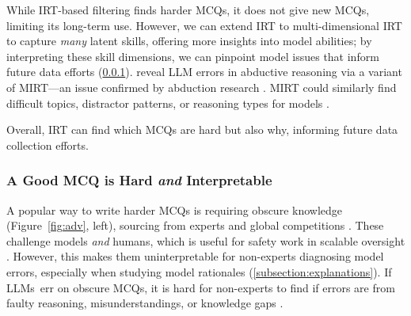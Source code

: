 
While IRT-based filtering finds harder MCQs, it does not give new MCQs, limiting its long-term use.
However, we can extend IRT to multi-dimensional IRT \cite[MIRT]{reckase200618} to capture \textit{many} latent skills, offering more insights into model abilities; by interpreting these skill dimensions, we can pinpoint model issues that inform future data efforts (\cref{subsection:hitl}).
\citet{gor2024great} reveal LLM errors in abductive reasoning via a variant of MIRT---an issue confirmed by abduction research \cite{del-fishel-2023-true, DBLP:conf/iclp/NguyenGTSS23}.
MIRT could similarly find difficult \mcqa topics, distractor patterns, or reasoning types for models \cite{benedetto-etal-2021-application}.



Overall, IRT can find which MCQs are hard but also why, informing future data collection efforts.





\subsubsection{A Good MCQ is Hard \textit{and} Interpretable} \label{subsection:hitl}

A popular way to write harder MCQs is requiring obscure knowledge
(Figure~\ref{fig:adv}, left), sourcing from experts
\cite{rein2023gpqa, phan2025hle} and global competitions
\cite{fang2024mathodyssey}.
%
These challenge models \textit{and} humans, which is useful for  safety work in scalable oversight \cite{bowman2022measuring}.
However, this makes them uninterpretable for non-experts diagnosing model errors, especially when studying model rationales (\cref{subsection:explanations}).
If LLMs~err on obscure MCQs, it is hard for non-experts to find if errors are from faulty reasoning, misunderstandings, or knowledge gaps \cite{anderson2025phdknowledgerequiredreasoning}.

